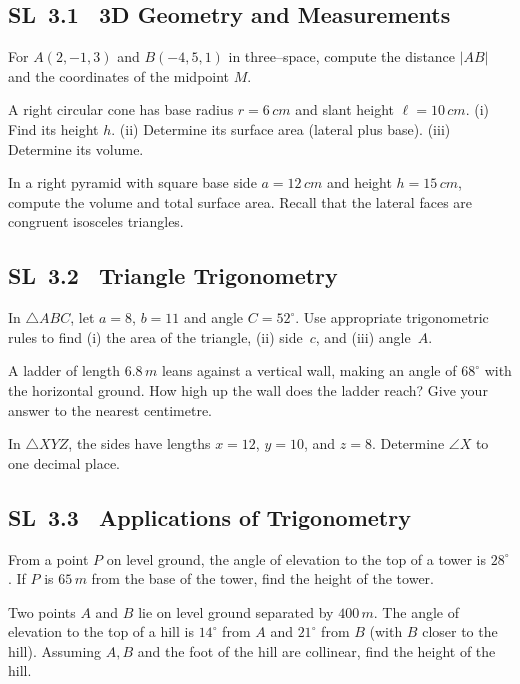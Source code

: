 \documentclass[11pt]{article}
\def\mathrm#1{#1}%
\newcommand{\tocsubsection}[1]{\subsection{#1}}
\newcounter{question}
\begin{document}
\tocsubsection{SL 3.1 \; 3D Geometry and Measurements}

\begin{question}
For $A(2,-1,3)$ and $B(-4,5,1)$ in three–space, compute the distance $|AB|$ and
the coordinates of the midpoint $M$.
\end{question}

\begin{question}
A right circular cone has base radius $r=6\,\mathrm{cm}$ and slant height
\(\ell=10\,\mathrm{cm}\).  (i) Find its height $h$.  (ii) Determine its
surface area (lateral plus base).  (iii) Determine its volume.
\end{question}

\begin{question}
In a right pyramid with square base side $a=12\,\mathrm{cm}$ and height
$h=15\,\mathrm{cm}$, compute the volume and total surface area.  Recall that
the lateral faces are congruent isosceles triangles.
\end{question}

\tocsubsection{SL 3.2 \; Triangle Trigonometry}

\begin{question}
In $\triangle ABC$, let $a=8$, $b=11$ and angle $C=52^{\circ}$.  Use
appropriate trigonometric rules to find (i) the area of the triangle,
(ii) side~$c$, and (iii) angle~$A$.
\end{question}

\begin{question}
A ladder of length $6.8\,\mathrm{m}$ leans against a vertical wall, making an
angle of $68^{\circ}$ with the horizontal ground.  How high up the wall does
the ladder reach?  Give your answer to the nearest centimetre.
\end{question}

\begin{question}
In $\triangle XYZ$, the sides have lengths $x=12$, $y=10$, and $z=8$.
Determine $\angle X$ to one decimal place.
\end{question}

\tocsubsection{SL 3.3 \; Applications of Trigonometry}

\begin{question}
From a point $P$ on level ground, the angle of elevation to the top of a
tower is $28^{\circ}$.  If $P$ is $65\,\mathrm{m}$ from the base of the tower,
find the height of the tower.
\end{question}

\begin{question}
Two points $A$ and $B$ lie on level ground separated by $400\,\mathrm{m}$.
The angle of elevation to the top of a hill is $14^{\circ}$ from $A$ and
$21^{\circ}$ from $B$ (with $B$ closer to the hill).  Assuming $A,B$ and the
foot of the hill are collinear, find the height of the hill.
\end{question}
\end{document}
